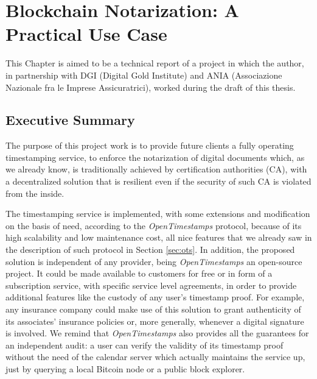 \chapter{Blockchain Notarization: A Practical Use Case}
\label{chpr:project}
This Chapter is aimed to be a technical report of a project in which the author, in partnership with DGI (Digital Gold Institute) and ANIA (Associazione Nazionale fra le Imprese Assicuratrici), worked during the draft of this thesis.

\bigskip
\section{Executive Summary}
The purpose of this project work is to provide future clients a fully operating timestamping service, to enforce the notarization of digital documents which, as we already know, is traditionally achieved by certification authorities (CA), with a decentralized solution that is resilient even if the security of such CA is violated from the inside.

\bigskip
\noindent
The timestamping service is implemented, with some extensions and modification on the basis of need, according to the \textit{OpenTimestamps} protocol, because of its high scalability and low maintenance cost, all nice features that we already saw in the description of such protocol in Section \ref{sec:ots}. In addition, the proposed solution is independent of any provider, being \textit{OpenTimestamps} an open-source project. It could be made available to customers for free or in form of a subscription service, with specific service level agreements, in order to provide additional features like the custody of any user's timestamp proof. For example, any insurance company could make use of this solution to grant authenticity of its associates' insurance policies or, more generally, whenever a digital signature is involved. We remind that \textit{OpenTimestamps} also provides all the guarantees for an independent audit: a user can verify the validity of its timestamp proof without the need of the calendar server which actually maintains the service up, just by querying a local Bitcoin node or a public block explorer. 